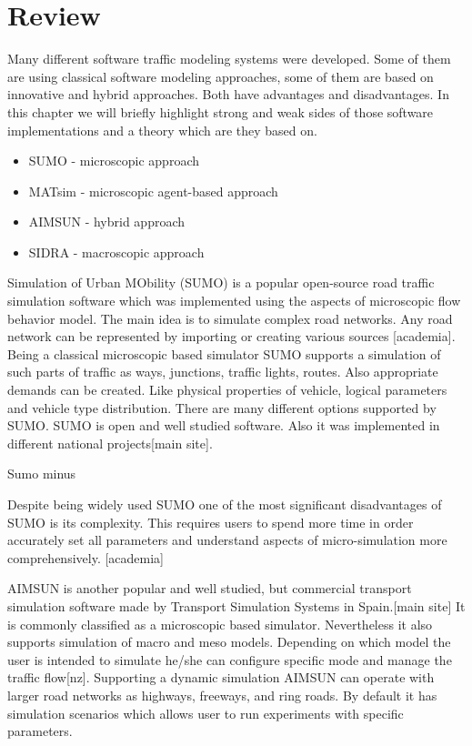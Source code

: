 \begin{itemize}
\begin{itemize}
	\end{itemize}
\end{itemize}

\section{Review}

Many different software traffic modeling systems were developed.
Some of them are using classical software modeling approaches, some of them are based on innovative and hybrid approaches.
Both have advantages and disadvantages.
In this chapter we will briefly highlight strong and weak sides of those software implementations
and a theory which are they based on.

\begin{itemize}
    \item SUMO -  microscopic approach
    \item MATsim - microscopic agent-based approach
    \item AIMSUN - hybrid approach
    \item SIDRA - macroscopic approach
\end{itemize}

Simulation of Urban MObility (SUMO) is a popular open-source road traffic simulation software which was implemented using the aspects of microscopic flow behavior model.
The main idea is to simulate complex road networks. Any road network can be represented by importing or creating various sources [academia].
Being a classical microscopic based simulator SUMO supports a simulation of such parts of traffic as ways, junctions, traffic lights, routes.
Also appropriate demands can be created. Like physical properties of vehicle, logical parameters and vehicle type distribution.
There are many different options supported by SUMO.
SUMO is open and well studied software. Also it was implemented in different national projects[main site].

Sumo minus

Despite being widely used SUMO one of the most significant disadvantages of SUMO is its complexity.
This requires users to spend more time in order accurately set
all parameters and understand aspects of micro-simulation more comprehensively. [academia]




AIMSUN is another popular and well studied, but commercial
transport simulation software made by Transport Simulation Systems in Spain.[main site]
It is commonly classified as a microscopic based simulator.
Nevertheless it also supports simulation of macro and meso models.
Depending on which model the user is intended to simulate he/she can configure specific mode and manage the traffic flow[nz].
Supporting a dynamic simulation AIMSUN can operate with larger road networks as highways, freeways, and ring roads.
By default it has simulation scenarios which allows user to run experiments with specific parameters.

